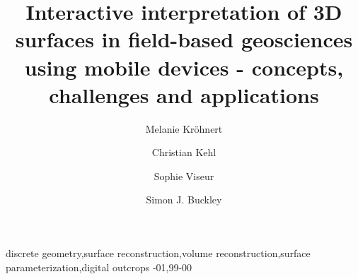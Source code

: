 \documentclass[review]{elsarticle}
\begin{document}
\setlength\emergencystretch{1.5em}

\begin{frontmatter}

\title{Interactive interpretation of 3D surfaces in field-based geosciences using mobile devices - concepts, challenges and applications}



\author[tudresden]{Melanie Kr\"{o}hnert}

\author[dtu]{Christian Kehl}


\author[cerege]{Sophie Viseur}

\author[uniresearch,uib]{Simon J. Buckley}

\address[tudresden]{Institute for Photogrammetry \& Remote Sensing, TU Dresden, Helmholtzstr. 10, 01069 Dresden, Germany}
\address[cerege]{Aix Marseille Universit\'{e}, CNRS, IRD, \gls{CEREGE} UM 34, Dept. Sedimentary and Reservoir Systems, 13001 Marseille, France}
\address[uniresearch]{Uni Research AS -- CIPR, Nyg{\aa}rdsgaten 112, 5008 Bergen, Norway}
\address[uib]{Department of Earth Science, University of Bergen, All\'{e}gaten 41, 5007 Bergen, Norway}
\address[dtu]{Danmarks Tekniske Universitet, DTU Compute, Richard Petersens Plads, Building 321/208, 2800 Kongens Lyngby, Denmark}


\begin{abstract}

\end{abstract}



\begin{keyword}
discrete geometry\sep surface reconstruction\sep volume reconstruction\sep surface parameterization\sep digital outcrops
-01\sep  99-00
\end{keyword}

\end{frontmatter}
\end{document}
